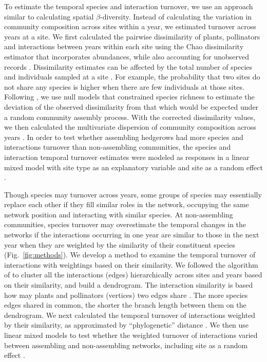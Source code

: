 \documentclass[12pt]{article}
\begin{document}
To estimate the temporal species and interaction turnover, we use an
approach similar to calculating spatial $\beta$-diversity. Instead of
calculating the variation in community composition across sites within
a year, we estimated turnover across years at a site. We first
calculated the pairwise dissimilarity of plants, pollinators and
interactions between years within each site using the Chao
dissimilarity estimator that incorporates abundances, while also
accounting for unobserved records \citep{chao-2005-148}. Dissimilarity
estimates can be affected by the total number of species and
individuals sampled at a site \citep[e.g.,][]{ponisio2015farm}. For
example, the probability that two sites do not share any species is
higher when there are few individuals at those sites. Following
\cite{ponisio2015farm}, we use null models that constrained species
richness to estimate the deviation of the observed dissimilarity from
that which would be expected under a random community assembly
process. With the corrected dissimilarity values, we then calculated
the multivariate dispersion of community composition across years
\citep{anderson-2011-19}. In order to test whether assembling
hedgerows had more species and interactions turnover than
non-assembling communities, the species and interaction temporal
turnover estimates were modeled as responses in a linear mixed model
with site type as an explanatory variable and site as a random effect
\citep{lme4, lmetest}.

Though species may turnover across years, some groups of species may
essentially replace each other if they fill similar roles in the
network, occupying the same network position and interacting with
similar species. At non-assembling communities, species turnover may
overestimate the temporal changes in the networks if the interactions
occurring in one year are similar to those in the next year when they
are weighted by the similarity of their constituent species
(Fig.~\ref{fig:methods}). We develop a method to examine the temporal
turnover of interactions with weightings based on their similarity. We
followed the algorithm of \cite{ahn2010link} to cluster all the
interactions (edges) hierarchically across sites and years based on
their similarity, and build a dendrogram. The interaction similarity
is based how may plants and pollinators (vertices) two edges share
\citep{ahn2010link, kalinka2011linkcomm}. The more species edges
shared in common, the shorter the branch length between them on the
dendrogram.  We next calculated the temporal turnover of interactions
weighted by their similarity, as approximated by ``phylogenetic''
distance \citep{graham2008phylogenetic, picante-2010-1463}. We then
use linear mixed models to test whether the weighted turnover of
interactions varied between assembling and non-assembling networks,
including site as a random effect \citep{lme4, lmetest}.
\end{document}
